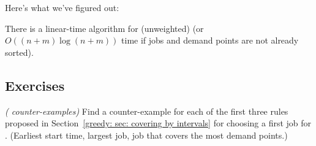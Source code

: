 
    


Here's what we've figured out:

\begin{theorem}
  There is a linear-time algorithm for (unweighted) 
  (or $O((n+m)\log (n+m))$ time if jobs and demand points are not already sorted).
\end{theorem}

\subsection{Exercises}

\exercise\label{greedy: exercise: covering by intervals rules} \emph{( counter-examples)}
Find a counter-example for each of the first three rules
proposed in Section~\ref{greedy: sec: covering by intervals}
for choosing a first job for .
(Earliest start time, largest job, job that covers the most demand points.)

